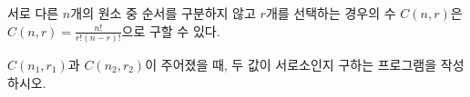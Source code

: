 서로 다른 $n$개의 원소 중 순서를 구분하지 않고 $r$개를 선택하는 경우의 수 $C(n, r)$은 $C(n, r) = \frac{n!}{r!(n-r)!}$으로 구할 수 있다.

$C(n_1, r_1)$과 $C(n_2, r_2)$이 주어졌을 때, 두 값이 서로소인지 구하는 프로그램을 작성하시오.